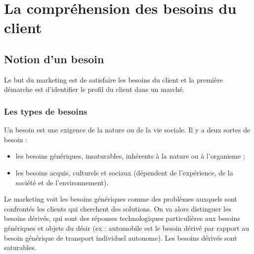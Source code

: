 \chapter{La compréhension des besoins du client}


	\section{Notion d'un besoin}

	Le but du marketing est de satisfaire les besoins du client et la première démarche est d'identifier le profil du client dans un marché. \\




\begin{comment}
	Un \textbf{besoin} est un état de manque de quelque chose de fondamental, insaturable, générique, propre à l'activité humaine et couvre :

	\begin{itemize}
		\item l'inné (nature, organisme) ;
		\item l'acquis socioculturel  (dépend de l'expérience, de la société, de l'environnement, ...).
	\end{itemize}
	
\end{comment}


		\subsection{Les types de besoins}

		Un besoin est une exigence de la nature ou de la vie sociale. Il y a deux sortes de besoin :

		\begin{itemize}
			\item les besoins génériques, insaturables, inhérents à la nature ou à l'organisme ;
			\item les besoins acquis, culturels et sociaux (dépendent de l'expérience, de la société et de l'environnement).
		\end{itemize}
		\n
		Le marketing voit les besoins génériques comme des problèmes auxquels sont confrontés les clients qui cherchent des solutions. On va alors distinguer les besoins dérivés, qui sont des réponses technologiques particulières aux besoins génériques et objets du désir (ex : automobile est le besoin dérivé par rapport au besoin générique de transport individuel autonome). Les besoins dérivés sont saturables.

